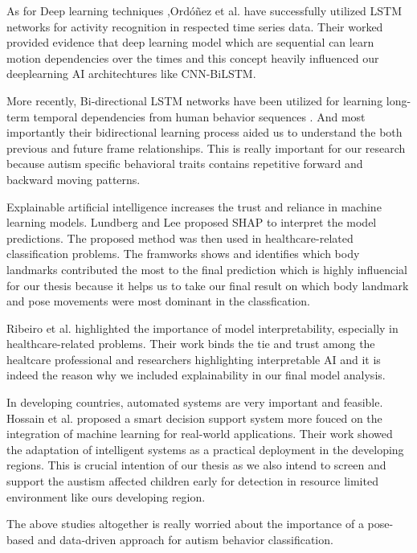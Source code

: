 As for Deep learning techniques ,Ord\'{o}\~{n}ez et al. \cite{ordonez2016deep} have successfully utilized LSTM networks for activity recognition in respected time series data. Their worked provided evidence that deep learning model which are sequential can learn motion dependencies over the times and this concept heavily influenced our deeplearning AI architechtures like CNN-BiLSTM.

More recently, Bi-directional LSTM networks have been utilized for learning long-term temporal dependencies from human behavior sequences \cite{zhao2020bidirectional}. And most importantly their bidirectional learning process aided us to understand the both previous and future frame relationships. This is really important for our research because autism specific behavioral traits contains repetitive forward and backward moving patterns.

Explainable artificial intelligence increases the trust and reliance in machine learning models. Lundberg and Lee \cite{lundberg2017unified} proposed SHAP to interpret the model predictions. The proposed method was then used in healthcare-related classification problems. The framworks shows and identifies which body landmarks contributed the most to the final prediction which is highly influencial for our thesis because it helps us to take our final result on which body landmark and pose movements were most dominant in the classfication.


Ribeiro et al. \cite{ribeiro2016should} highlighted the importance of model interpretability, especially in healthcare-related problems. Their work binds the tie and trust among the healtcare professional and researchers highlighting interpretable AI and it is indeed the reason why we included explainability in our final model analysis.

In developing countries, automated systems are very important and feasible. Hossain et al. \cite{hossain2023smart} proposed a smart decision support system more fouced on the integration of machine learning for real-world applications. Their work showed the adaptation of intelligent systems as a practical deployment in the developing regions. This is crucial intention of our thesis as we also intend to screen and support the austism affected children early for detection in resource limited environment like ours developing region.

The above studies altogether is really worried about the importance of a pose-based and data-driven approach for autism behavior classification.


